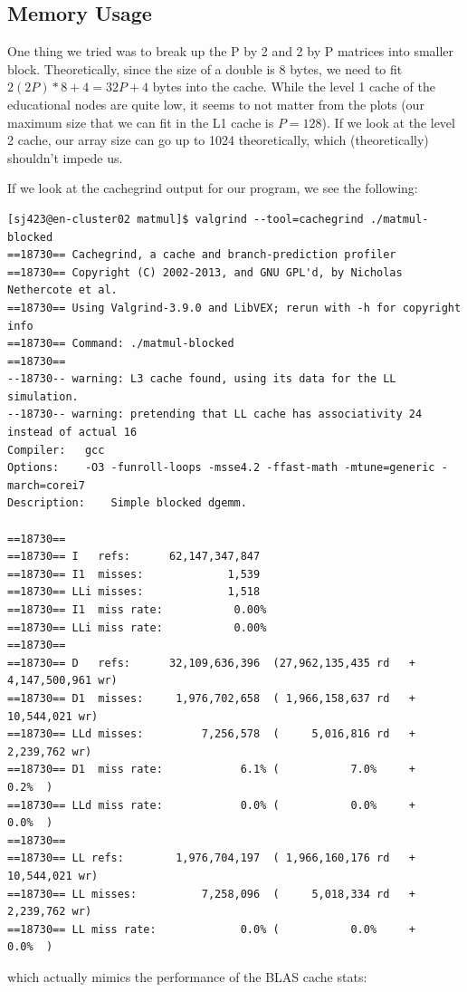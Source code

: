 \documentclass{article}
\begin{document}
    \subsection{Memory Usage}

    One thing we tried was to break up the P by 2 and 2 by P matrices into smaller block. Theoretically, since the size of a double is 8 bytes, we need to fit
    $2(2P)*8 + 4 = 32P + 4$ bytes into the cache. While the level 1 cache of the educational nodes are quite low, it seems to not matter from the plots (our maximum
    size that we can fit in the L1 cache is $P=128$). If we look at the level 2 cache, our array size can go up to 1024 theoretically, which (theoretically) shouldn't
    impede us.

    If we look at the cachegrind output for our program, we see the following:
    \begin{lstlisting}
[sj423@en-cluster02 matmul]$ valgrind --tool=cachegrind ./matmul-blocked
==18730== Cachegrind, a cache and branch-prediction profiler
==18730== Copyright (C) 2002-2013, and GNU GPL'd, by Nicholas Nethercote et al.
==18730== Using Valgrind-3.9.0 and LibVEX; rerun with -h for copyright info
==18730== Command: ./matmul-blocked
==18730== 
--18730-- warning: L3 cache found, using its data for the LL simulation.
--18730-- warning: pretending that LL cache has associativity 24 instead of actual 16
Compiler:	gcc
Options:	-O3 -funroll-loops -msse4.2 -ffast-math -mtune=generic -march=corei7
Description:	Simple blocked dgemm.

==18730== 
==18730== I   refs:      62,147,347,847
==18730== I1  misses:             1,539
==18730== LLi misses:             1,518
==18730== I1  miss rate:           0.00%
==18730== LLi miss rate:           0.00%
==18730== 
==18730== D   refs:      32,109,636,396  (27,962,135,435 rd   + 4,147,500,961 wr)
==18730== D1  misses:     1,976,702,658  ( 1,966,158,637 rd   +    10,544,021 wr)
==18730== LLd misses:         7,256,578  (     5,016,816 rd   +     2,239,762 wr)
==18730== D1  miss rate:            6.1% (           7.0%     +           0.2%  )
==18730== LLd miss rate:            0.0% (           0.0%     +           0.0%  )
==18730== 
==18730== LL refs:        1,976,704,197  ( 1,966,160,176 rd   +    10,544,021 wr)
==18730== LL misses:          7,258,096  (     5,018,334 rd   +     2,239,762 wr)
==18730== LL miss rate:             0.0% (           0.0%     +           0.0%  )
    \end{lstlisting}

    which actually mimics the performance of the BLAS cache stats:
\end{document}
